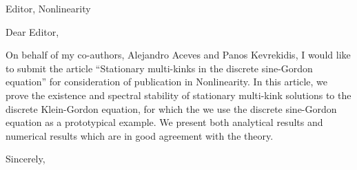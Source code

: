 \documentclass[11pt]{letter}
\begin{document}
\address{Ross Parker \\
Department of Mathematics \\
Southern Methodist University \\
Dallas, TX 75275 \\
\texttt{rhparker@smu.edu}}%
\signature{Ross Parker}
\begin{letter}{Editor, Nonlinearity}

\opening{Dear Editor,}

On behalf of my co-authors, Alejandro Aceves and Panos Kevrekidis, I would like to submit the article ``Stationary multi-kinks in the discrete sine-Gordon equation'' for consideration of publication in Nonlinearity. In this article, we prove the existence and spectral stability of stationary multi-kink solutions to the discrete Klein-Gordon equation, for which the we use the discrete sine-Gordon equation as a prototypical example. We present both analytical results and numerical results which are in good agreement with the theory.

\closing{Sincerely,}

\end{letter}
\end{document}
